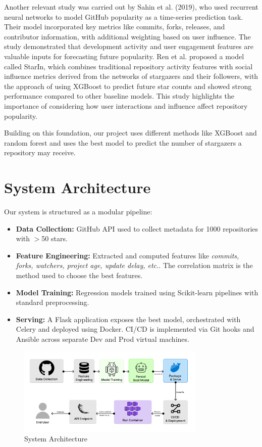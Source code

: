 \documentclass[12pt,a4paper]{article}
\begin{document}
Another relevant study was carried out by Sahin et al. (2019),\cite{4} who used recurrent neural networks to model GitHub popularity as a time-series prediction task. Their model incorporated key metrics like commits, forks, releases, and contributor information, with additional weighting based on user influence. The study demonstrated that development activity and user engagement features are valuable inputs for forecasting future popularity. Ren et al.\cite{2} proposed a model called StarIn, which combines traditional repository activity features with social influence metrics derived from the networks of stargazers and their followers, with the approach of using XGBoost to predict future star counts and showed strong performance compared to other baseline models. This study highlights the importance of considering how user interactions and influence affect repository popularity.

Building on this foundation, our project uses different methods like XGBoost and random forest and uses the best model to predict the number of stargazers a repository may receive. 

\section{System Architecture}
Our system is structured as a modular pipeline:
\begin{itemize}
    \item \textbf{Data Collection:} GitHub API used to collect metadata for 1000 repositories with $>$50 stars.
    \item \textbf{Feature Engineering:} Extracted and computed features like \textit{commits, forks, watchers, project age, update delay, etc.}. The correlation matrix is the method used to choose the best features.
    \item \textbf{Model Training:} Regression models trained using Scikit-learn pipelines with standard preprocessing.
    \item \textbf{Serving:} A Flask application exposes the best model, orchestrated with Celery and deployed using Docker. CI/CD is implemented via Git hooks and Ansible across separate Dev and Prod virtual machines.
\end{itemize}

\begin{figure}[H]
  \centering
  \includegraphics[width=0.8\textwidth]{Architecture.png}
  \caption{System Architecture}
  \label{fig:my-image}
\end{figure}
\end{document}
